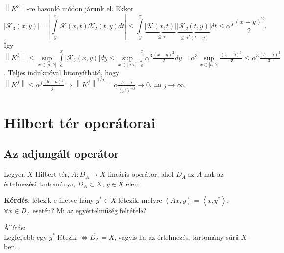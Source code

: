 \documentclass[12pt,a4paper]{scrartcl}
\newenvironment{allitas}{}{}
\begin{document}
\(\left\| K^{3} \right\|\)-re hasonló módon járunk el. Ekkor
\[\left| {{\mathcal{K}_3}\left( {x,y} \right)} \right| = \left| {\int\limits_y^x {\mathcal{K}\left( {x,t} \right){\mathcal{K}_2}\left( {t,y} \right)dt} } \right| \leqslant \int\limits_y^x {\underbrace {\left| {\mathcal{K}\left( {x,t} \right)} \right|}_{ \leqslant \alpha }\underbrace {\left| {{\mathcal{K}_2}\left( {t,y} \right)} \right|}_{ \leqslant {\alpha ^2}\left( {t - y} \right)}dt}  \leqslant {\alpha ^3}\frac{{{{\left( {x - y} \right)}^2}}}{2}.\]
Így
\(\left\| K^{3} \right\| \leq \sup\limits_{x \in {\lbrack{a,b}\rbrack}}{\int\limits_{a}^{x}{\left| {\mathcal{K}_{3}\left( {x,y} \right)} \right|dy}} \leq \sup\limits_{x \in {\lbrack{a,b}\rbrack}}{\int\limits_{a}^{x}{\alpha^{3}\frac{\left( {x - y} \right)^{2}}{2}dy}} = \alpha^{3}\sup\limits_{x \in {\lbrack{a,b}\rbrack}}\frac{\left( {x - a} \right)^{3}}{3!} \leq \alpha^{3}\frac{\left( {b - a} \right)^{3}}{3!}\).
Teljes indukcióval bizonyítható, hogy
\(\left. \left\| K^{j} \right\| \leq \alpha^{j}\frac{\left( {b - a} \right)^{j}}{j!}\Rightarrow\left\| K^{j} \right\|^{1/j} = \alpha\frac{b - a}{\left( {j!} \right)^{1/j}}\rightarrow 0 \right.\),
ha \(\left. j\rightarrow\infty \right.\).

\hypertarget{hilbert-ter-operatorai}{%
\section{Hilbert tér operátorai}\label{hilbert-ter-operatorai}}

\hypertarget{az-adjungalt-operator}{%
\subsection{Az adjungált operátor}\label{az-adjungalt-operator}}

Legyen \(X\) Hilbert tér, \(\left. A:D_{A}\rightarrow X \right.\)
lineáris operátor, ahol \(D_{A}\) az \(A\)-nak az értelmezési
tartománya, \(D_{A} \subset X\), \(y \in X\) elem.

\textbf{Kérdés}: létezik-e illetve hány \(y^{*} \in X\) létezik, melyre
\(\left\langle {Ax,y} \right\rangle = \left\langle {x,y^{*}} \right\rangle\),
\(\forall x \in D_{A}\) esetén? Mi az egyértelműség feltétele?

\begin{allitas}

Állítás:\\
Legfeljebb egy \(y^{*}\) létezik
\(\left. \Leftrightarrow\overline{D_{A}} = X \right.\), vagyis ha az
értelmezési tartomány sűrű \(X\)-ben.

\end{allitas}
\end{document}
